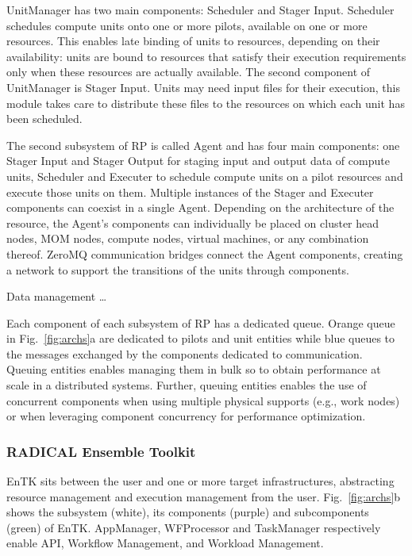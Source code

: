 \documentclass[preprint,12pt, a4paper]{elsarticle}
\begin{document}
UnitManager has two main components: Scheduler and Stager Input. Scheduler
schedules compute units onto one or more pilots, available on one or more
resources. This enables late binding of units to resources, depending on
their availability: units are bound to resources that satisfy their execution
requirements only when these resources are actually available. The second
component of UnitManager is Stager Input. Units may need input files for
their execution, this module takes care to distribute these files to the
resources on which each unit has been scheduled.

The second subsystem of RP is called Agent and has four main components: one
Stager Input and Stager Output for staging input and output data of compute
units, Scheduler and Executer to schedule compute units on a pilot resources
and execute those units on them. Multiple instances of the Stager and
Executer components can coexist in a single Agent. Depending on the
architecture of the resource, the Agent's components can individually be
placed on cluster head nodes, MOM nodes, compute nodes, virtual machines, or
any combination thereof. ZeroMQ communication bridges connect the Agent
components, creating a network to support the transitions of the units
through components.

Data management \ldots{}

Each component of each subsystem of RP has a dedicated queue. Orange queue in
Fig.~\ref{fig:archs}a are dedicated to pilots and unit entities while blue
queues to the messages exchanged by the components dedicated to
communication. Queuing entities enables managing them in bulk so to obtain
performance at scale in a distributed systems. Further, queuing entities
enables the use of concurrent components when using multiple physical
supports (e.g., work nodes) or when leveraging component concurrency for
performance optimization.


\subsubsection{RADICAL Ensemble Toolkit}\label{sssec:arch_entk}

EnTK sits between the user and one or more target infrastructures,
abstracting resource management and execution management from the user.
Fig.~\ref{fig:archs}b shows the subsystem (white), its components (purple)
and subcomponents (green) of EnTK\@. AppManager, WFProcessor and TaskManager
respectively enable API, Workflow Management, and Workload Management.
\end{document}
